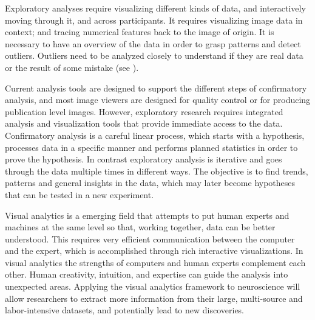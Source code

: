 \documentclass{frontiersSCNS} %
\begin{document}
Exploratory analyses require visualizing different kinds of data, and interactively moving through it, and across participants. It requires visualizing image data in context; and tracing numerical features back to the image of origin. It is necessary to have an overview of the data in order to grasp patterns and detect outliers. Outliers need to be analyzed closely to understand if they are real data or the result of some mistake (see \cite{schneiderman_designing_1998}). 

Current analysis tools  are designed to support the different steps of confirmatory analysis, and most image viewers are designed for quality control or for producing publication level images. However, exploratory research requires integrated analysis and visualization tools that provide immediate access to the data. Confirmatory analysis is a careful linear process, which starts with a hypothesis, processes data in a specific manner and performs planned statistics in order to prove the hypothesis. In contrast exploratory analysis is iterative and goes through the data multiple times in different ways. The objective is to find trends, patterns and general insights in the data, which may later become hypotheses that can be tested in a new experiment.

Visual analytics\citep{cook_illuminating_2005} is a emerging field that attempts to put human experts and machines at the same level so that, working together, data can be better understood. This requires very efficient communication between the computer and the expert, which is accomplished through rich interactive visualizations. In visual analytics the strengths of computers and human experts complement each other. Human creativity, intuition, and expertise can guide the analysis into unexpected areas. Applying the visual analytics framework to neuroscience will allow researchers to extract more information from their large, multi-source and labor-intensive datasets, and potentially lead to new discoveries.
\end{document}

